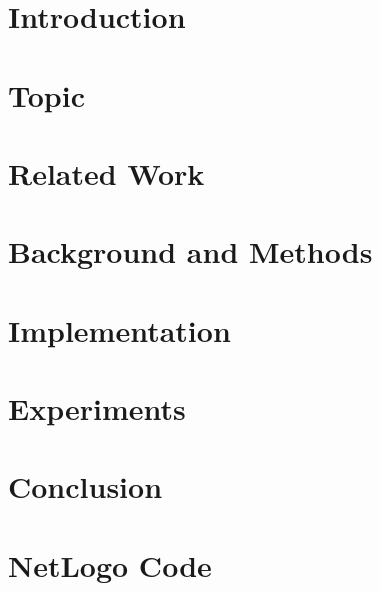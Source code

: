 \documentclass[12pt]{report}
\begin{document}

\pagestyle{fancy}
\rfoot{\thepage}
\cfoot{}






\newpage
\tableofcontents
\listoffigures
\listoftables
\clearpage


\pagestyle{plain}

\chapter{Introduction}
\label{sec:intro}


\chapter{Topic}
\label{sec:Slimemold}


\chapter{Related Work}
\label{sec:relatedwork}


\chapter{Background and Methods}
\label{sec:methods}


\chapter{Implementation}
\label{sec:implementation}


\chapter{Experiments}
\label{sec:experiments}


\chapter{Conclusion}
\label{sec:conclusion}


\newpage




\newpage

\appendix
{}
\chapter{NetLogo Code}
\label{sec:appendix-netlogo}



\end{document}
